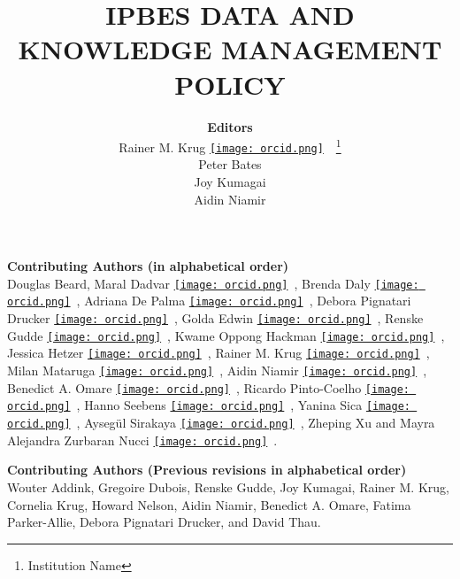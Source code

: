 \documentclass{article}
\title{IPBES DATA AND KNOWLEDGE MANAGEMENT POLICY}
\author{
    \LARGE \textbf{Editors} \\[0.5cm]  %
    Rainer M. Krug \href{https://orcid.org/0000-0002-7490-0066}{\texttt{[image: orcid.png]}}\ \href{mailto:Rainer@Krugs.de}{\faEnvelope}\ \thanks{Institution Name} \\
    Peter Bates \\ 
    Joy Kumagai \\
    Aidin Niamir
}
\date{}
\begin{document}
\renewcommand{\author}{Editors}
\maketitle


\begin{center}

    {\LARGE \textbf{Contributing Authors (in alphabetical order)}} \\[0.5em]
    Douglas Beard, 
    Maral Dadvar \href{https://orcid.org/0000-0002-1351-2561}{\texttt{[image: orcid.png]}}\ , 
    Brenda Daly \href{https://orcid.org/0000-0002-3732-8339}{\texttt{[image: orcid.png]}}\ , 
    Adriana De Palma \href{https://orcid.org/0000-0002-5345-4917}{\texttt{[image: orcid.png]}}\ , 
    Debora Pignatari Drucker \href{https://orcid.org/0000-0003-4177-1322}{\texttt{[image: orcid.png]}}\ , 
    Golda Edwin \href{https://orcid.org/0000-0002-7487-3272}{\texttt{[image: orcid.png]}}\ , 
    Renske Gudde \href{https://orcid.org/0000-0003-4727-1011}{\texttt{[image: orcid.png]}}\ , 
    Kwame Oppong Hackman \href{https://orcid.org/0000-0002-2201-9314}{\texttt{[image: orcid.png]}}\ , 
    Jessica Hetzer \href{https://orcid.org/0000-0002-2384-0024}{\texttt{[image: orcid.png]}}\ , 
    Rainer M. Krug \href{https://orcid.org/0000-0002-7490-0066}{\texttt{[image: orcid.png]}}\ ,
    Milan Mataruga \href{https://orcid.org/0000-0002-9318-7550}{\texttt{[image: orcid.png]}}\ , 
    Aidin Niamir \href{https://orcid.org/0000-0003-4511-3407}{\texttt{[image: orcid.png]}}\ , 
    Benedict A. Omare \href{https://orcid.org/0000-0003-3704-0332}{\texttt{[image: orcid.png]}}\ , 
    Ricardo Pinto-Coelho \href{https://orcid.org/0000-0003-4486-1243}{\texttt{[image: orcid.png]}}\ , 
    Hanno Seebens \href{https://orcid.org/0000-0001-8993-6419}{\texttt{[image: orcid.png]}}\ , 
    Yanina Sica \href{https://orcid.org/0000-0002-1720-0127}{\texttt{[image: orcid.png]}}\ , 
    Aysegül Sirakaya \href{https://orcid.org/0000-0003-3330-1750}{\texttt{[image: orcid.png]}}\ , 
    Zheping Xu 
    and
    Mayra Alejandra Zurbaran Nucci \href{https://orcid.org/0000-0003-1231-3859}{\texttt{[image: orcid.png]}}\ .
    
    {\LARGE \textbf{Contributing Authors (Previous revisions in alphabetical order)}} \\[0.5em]
    Wouter Addink, Gregoire Dubois, Renske Gudde, Joy Kumagai, Rainer M. Krug, Cornelia Krug, Howard Nelson, Aidin Niamir, Benedict A. Omare, Fatima Parker-Allie, Debora Pignatari Drucker, and David Thau.
    

\end{center}
\end{document}
